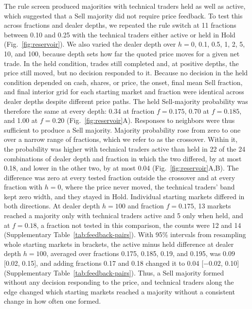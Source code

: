The rule screen produced majorities with technical traders held as
well as active, which suggested that a Sell majority did not require
price feedback. To test this across
fractions and dealer depths, we repeated the rule switch at 11 fractions
between 0.10 and 0.25 with the technical traders either active or held
in Hold (Fig.~\ref{fig:reservoir}). We also varied the dealer depth over
$h=0$, 0.1, 0.5, 1, 2, 5, 10, and 100, because depth sets how far the
quoted price moves for a given net trade. In the held condition,
trades still completed and, at positive depths, the price still moved,
but no decision responded to it. Because no decision in the held
condition depended on cash, shares, or price, the onset, final mean Sell
fraction, and final interior grid for each starting market and fraction
were identical across dealer depths despite different price paths. The
held Sell-majority probability was therefore the same at every depth:
0.34 at fraction $f=0.175$, 0.70 at $f=0.185$, and
1.00 at $f=0.20$ (Fig.~\ref{fig:reservoir}A). Responses to neighbors
were thus sufficient to produce a Sell majority.
Majority probability rose from zero to one over a narrow range of
fractions, which we refer to as the crossover. Within it, the
probability was higher with technical traders active than held in 22 of
the 24 combinations of dealer depth and fraction in which the two
differed, by at most 0.18, and lower in the other two, by at most 0.04
(Fig.~\ref{fig:reservoir}A,B). The difference was zero at every tested
fraction outside the crossover and at every fraction with $h=0$, where
the price never moved, the technical traders' band kept zero width, and
they stayed in Hold. Individual starting markets differed in both
directions. At dealer depth $h=100$ and fraction $f=0.175$, 13 markets
reached a majority only with technical traders active and 5 only when
held, and at $f=0.18$, a fraction not tested in this comparison, the
counts were 12 and 14 (Supplementary Table~\ref{tab:feedback-pairs}).
With 95\% intervals from resampling whole starting markets in brackets,
the active minus held difference at dealer depth $h=100$, averaged over
fractions
0.175, 0.185, 0.19, and 0.195, was 0.09 [0.02, 0.15], and adding
fractions 0.17 and 0.18 changed it to 0.04 [$-0.02$, 0.10]
(Supplementary Table~\ref{tab:feedback-pairs}). Thus, a Sell majority
formed without any decision responding to the price, and technical
traders along the edge changed which starting markets reached a majority
without a consistent change in how often one formed.



